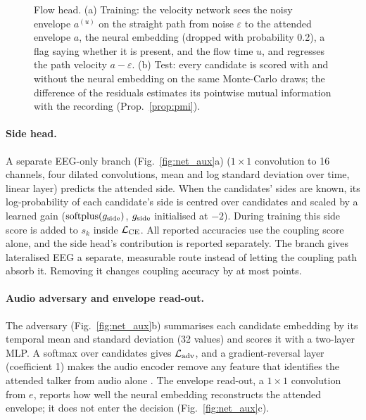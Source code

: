 \documentclass[twoside]{article}
\begin{document}
\begin{figure}[t]\centering
\resizebox{\textwidth}{!}{}
\caption{Flow head. (a) Training: the velocity network sees the noisy envelope $a^{(u)}$ on the
straight path from noise $\varepsilon$ to the attended envelope $a$, the neural embedding
(dropped with probability 0.2), a flag saying whether it is present, and the flow time $u$,
and regresses the path velocity $a-\varepsilon$. (b) Test: every candidate is scored with
and without the neural embedding on the same Monte-Carlo draws; the difference of the
residuals estimates its pointwise mutual information with the recording
(Prop.~\ref{prop:pmi}).}\label{fig:net_flow}
\end{figure}

\paragraph{Side head.} A separate EEG-only branch (Fig.~\ref{fig:net_aux}a) ($1{\times}1$ convolution to 16
channels, four dilated convolutions, mean and log standard deviation over time, linear
layer) predicts the attended side. When the candidates' sides are known, its
log-probability of each candidate's side is centred over candidates and scaled by a learned gain ($\mathrm{softplus}(g_{\rm side})$,
$g_{\rm side}$ initialised at $-2$). During training this side score is added to $s_k$ inside
$\mathcal L_{\rm CE}$. All reported accuracies use the coupling score alone, and the side
head's contribution is reported separately. The branch gives lateralised EEG a separate,
measurable route instead of letting the coupling path absorb it. Removing it changes
coupling accuracy by at most \ablOtherMax{} points.

\paragraph{Audio adversary and envelope read-out.} The adversary (Fig.~\ref{fig:net_aux}b) summarises each candidate
embedding by its temporal mean and standard deviation (32 values) and scores it with a
two-layer MLP. A softmax over candidates gives $\mathcal L_{\rm adv}$, and a
gradient-reversal layer (coefficient 1) makes the audio encoder remove any feature that
identifies the attended talker from audio alone \citep{ganin2016domain}. The envelope
read-out, a $1{\times}1$ convolution from $e$, reports how well the neural embedding
reconstructs the attended envelope; it does not enter the decision (Fig.~\ref{fig:net_aux}c).
\end{document}
